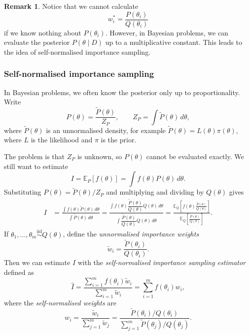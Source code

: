 \documentclass[11pt, titlepage]{article} %
\numberwithin{equation}{section}
\theoremstyle{definition}
\newtheorem{remark}{Remark}
\numberwithin{assumption}{section}
\begin{document}
\begin{remark}
    Notice that we cannot calculate
    \begin{equation*}
        w_i^*=\frac{P(\theta_i)}{Q(\theta_i)}
    \end{equation*}
    if we know nothing about $P(\theta_i)$. However, in Bayesian problems, we can evaluate the posterior $P(\theta\mid D)$ up to a multiplicative constant. This leads to the idea of self-normalised importance sampling.
\end{remark}


\subsubsection*{Self-normalised importance sampling}

In Bayesian problems, we often know the posterior only up to proportionality. Write
\begin{equation*}
    P(\theta)=\frac{\tilde P(\theta)}{Z_P},
    \qquad
    Z_P=\int \tilde P(\theta)\,d\theta,
\end{equation*}
where $\tilde P(\theta)$ is an unnormalised density, for example $\tilde P(\theta)=L(\theta)\pi(\theta)$, where $L$ is the likelihood and $\pi$ is the prior.

The problem is that $Z_P$ is unknown, so $P(\theta)$ cannot be evaluated exactly. We still want to estimate
\begin{equation*}
    I=\mathbb{E}_{P}[f(\theta)]=\int f(\theta)P(\theta)\,d\theta.
\end{equation*}
Substituting $P(\theta)=\tilde P(\theta)/Z_P$ and multiplying and dividing by $Q(\theta)$ gives
\begin{align*}
    I
    &= \frac{\int f(\theta)\tilde P(\theta)\,d\theta}{\int \tilde P(\theta)\,d\theta}= \frac{\int f(\theta)\dfrac{\tilde P(\theta)}{Q(\theta)}Q(\theta)\,d\theta}
    {\int \dfrac{\tilde P(\theta)}{Q(\theta)}Q(\theta)\,d\theta}=\frac{\mathbb{E}_Q\left[f(\theta)\frac{\tilde P(\theta)}{Q(\theta)}\right]}{\mathbb{E}_Q\left[\frac{\tilde P(\theta)}{Q(\theta)}\right]}.
\end{align*}
If $\theta_1,\dots,\theta_m \overset{\mathrm{iid}}{\sim} Q(\theta)$, define the \textit{unnormalised importance weights}
\begin{equation*}
    \tilde w_i=\frac{\tilde P(\theta_i)}{Q(\theta_i)}.
\end{equation*}
Then we can estimate $I$ with the \textit{self-normalised importance sampling estimator} defined as
\begin{equation*}
    \hat I
    =
    \frac{\sum_{i=1}^m f(\theta_i)\tilde w_i}{\sum_{i=1}^m \tilde w_i}
    =
    \sum_{i=1}^m f(\theta_i)w_i,
\end{equation*}
where the \textit{self-normalised weights} are
\begin{equation*}
    w_i=\frac{\tilde w_i}{\sum_{j=1}^m \tilde w_j}
    =
    \frac{\tilde P(\theta_i)/Q(\theta_i)}
    {\sum_{j=1}^m \tilde P(\theta_j)/Q(\theta_j)}.
\end{equation*}
\end{document}
